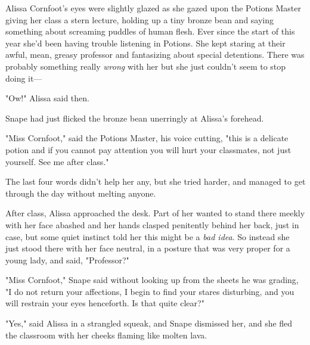 Alissa Cornfoot's eyes were slightly glazed as she gazed upon the Potions 
Master giving her class a stern lecture, holding up a tiny bronze bean and 
saying something about screaming puddles of human flesh. Ever since the start 
of this year she'd been having trouble listening in Potions. She kept staring 
at their awful, mean, greasy professor and fantasizing about special 
detentions. There was probably something really \emph{wrong} with her but she 
just couldn't seem to stop doing it---

"Ow!" Alissa said then.

Snape had just flicked the bronze bean unerringly at Alissa's forehead.

"Miss Cornfoot," said the Potions Master, his voice cutting, "this is a 
delicate potion and if you cannot pay attention you will hurt your classmates, 
not just yourself. See me after class."

The last four words didn't help her any, but she tried harder, and managed to 
get through the day without melting anyone.

After class, Alissa approached the desk. Part of her wanted to stand there 
meekly with her face abashed and her hands clasped penitently behind her back, 
just in case, but some quiet instinct told her this might be a \emph{bad idea}. 
So instead she just stood there with her face neutral, in a posture that was 
very proper for a young lady, and said, "Professor?"

"Miss Cornfoot," Snape said without looking up from the sheets he was grading, 
"I do not return your affections, I begin to find your stares disturbing, and 
you will restrain your eyes henceforth. Is that quite clear?"

"Yes," said Alissa in a strangled squeak, and Snape dismissed her, and she fled 
the classroom with her cheeks flaming like molten lava.
